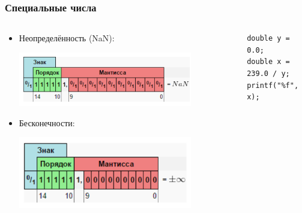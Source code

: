 \documentclass{../../slides-style}
\begin{document}
    \begin{frame}[fragile]
        \frametitle{Специальные числа}
        \begin{columns}
            \begin{column}{0.6\textwidth}
                \begin{itemize}
                    \item Неопределённость (NaN):
                    \begin{center}
                        \includegraphics[width=0.8\textwidth]{nan.png}
                    \end{center}
                    \item Бесконечности:
                    \begin{center}
                        \includegraphics[width=0.8\textwidth]{infinity.png}
                    \end{center}
                \end{itemize}
            \end{column}
            \begin{column}{0.4\textwidth}
                \begin{footnotesize}
                    \begin{verbatim}
double y = 0.0;
double x = 239.0 / y;
printf("%f", x);
                    \end{verbatim}
                \end{footnotesize}
            \end{column}
        \end{columns}
    \end{frame}
\end{document}
